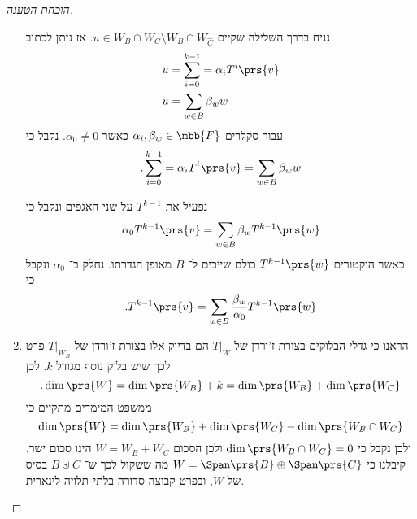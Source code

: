 \documentclass[a4paper,10pt,twoside,openany]{article}
\begin{document}
\begin{proof}[הוכחת הטענה]
\begin{enumerate}
נניח בדרך השלילה שקיים
$u \in W_B \cap W_C \setminus W_B \cap W_{\hat{C}}$.
אז ניתן לכתוב
\begin{align*}
u &= \sum_{i=0}^{k-1} = \alpha_i T^i\prs{v} \\
u &= \sum_{w \in B} \beta_w w
\end{align*}
עבור סקלרים
$\alpha_i, \beta_w \in \mbb{F}$
כאשר
$\alpha_0 \neq 0$.
נקבל כי
\[\text{.} \sum_{i=0}^{k-1} = \alpha_i T^i\prs{v} = \sum_{w \in B} \beta_w w\]

נפעיל את
$T^{k-1}$
על שני האגפים ונקבל כי
\[ \alpha_0 T^{k-1}\prs{v} = \sum_{w \in B} \beta_w T^{k-1}\prs{w} \]
כאשר הוקטורים
$T^{k-1}\prs{w}$
כולם שייכים ל־%
$B$
מאופן הגדרתו.
נחלק ב־%
$\alpha_0$
ונקבל כי
\[ \text{.} T^{k-1}\prs{v} = \sum_{w \in B} \frac{\beta_w}{\alpha_0} T^{k-1}\prs{w} \]

\item %

הראנו כי גדלי הבלוקים בצורת ז'ורדן של
$T|_W$
הם בדיוק אלו בצורת ז'ורדן של
$T|_{W_B}$
פרט לכך שיש בלוק נוסף מגודל
$k$.
לכן
\[\text{.} \dim\prs{W} = \dim\prs{W_B} + k = \dim\prs{W_B} + \dim\prs{W_C}\]
ממשפט המימדים מתקיים כי
\[\dim\prs{W} = \dim\prs{W_B} + \dim\prs{W_C} - \dim\prs{W_B \cap W_C}\]
ולכן נקבל כי
$\dim\prs{W_B \cap W_C} = 0$
ולכן הסכום
$W = W_B + W_C$
הינו סכום ישר.
קיבלנו כי
$W = \Span\prs{B} \oplus \Span\prs{C}$
מה ששקול לכך ש־%
$B \uplus C$
בסיס של
$W$,
ובפרט קבוצה סדורה בלתי־תלויה לינארית.
\end{enumerate}

\end{proof}
\end{document}
